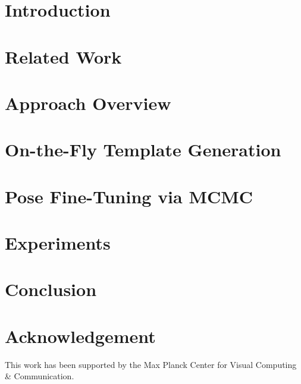 \documentclass[10pt,twocolumn,letterpaper]{article}
\begin{document}
\begin{abstract}

\end{abstract}

\section{Introduction}
\label{sec:intro}

%
\section{Related Work}
\label{sec:related}


\section{Approach Overview}
\label{sec:nz-who}


\section{On-the-Fly Template Generation}
\label{sec:approach}


\section{Pose Fine-Tuning via MCMC}
\label{sec:fine}


\section{Experiments}
\label{sec:experiments}


\section{Conclusion}
\label{conclusion}
\vspace{-.2cm}


\section{Acknowledgement}
This work has been supported by the Max Planck Center for Visual Computing \& Communication.

\clearpage
\clearpage
{\small


}
\end{document}
